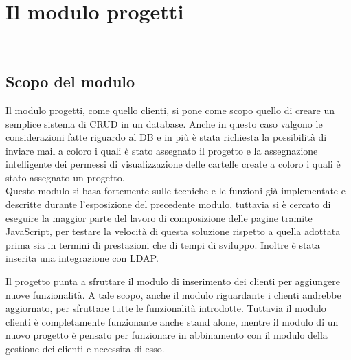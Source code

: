 
\chapter{Il modulo progetti}
\label{cap:modulo-progetti}

\\

\section{Scopo del modulo} Il modulo progetti, come quello clienti, si pone come scopo quello di creare un semplice sistema di CRUD in un database. Anche in questo caso valgono le considerazioni fatte riguardo al DB e in più è stata richiesta la possibilità di inviare mail a coloro i quali è stato assegnato il progetto e la assegnazione intelligente dei permessi di visualizzazione delle cartelle create a coloro i quali è stato assegnato un progetto.\\

Questo modulo si basa fortemente sulle tecniche e le funzioni già implementate e descritte durante l'esposizione del precedente modulo, tuttavia si è cercato di eseguire la  maggior parte del lavoro di composizione delle pagine tramite JavaScript, per testare la velocità di questa soluzione rispetto a quella adottata prima sia in termini di prestazioni che di tempi di sviluppo. Inoltre è stata inserita una integrazione con LDAP.

Il progetto punta a sfruttare il modulo di inserimento dei clienti per aggiungere nuove funzionalità.
A tale scopo, anche il modulo riguardante i clienti andrebbe aggiornato, per sfruttare tutte le funzionalità introdotte. Tuttavia il modulo clienti è completamente funzionante anche stand alone, mentre il modulo di un nuovo progetto è pensato per funzionare in abbinamento con il modulo della gestione dei clienti e necessita di esso.
